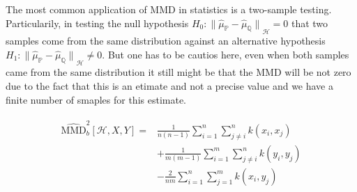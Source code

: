 The most common application of MMD in statistics is a two-sample testing. Particularily, in testing the null hypothesis $H_0:{\lVert \widehat{\mu}_{\mathds{P}} - \widehat{\mu}_{\mathds{Q}} \rVert }_{\mathscr{H}}=0$ that two samples come from the same distribution against an alternative hypothesis $H_1:{\lVert \widehat{\mu}_{\mathds{P}} - \widehat{\mu}_{\mathds{Q}} \rVert }_{\mathscr{H}}\neq0$. But one has to be cautios here, even when both samples came from the same distribution it still might be that the MMD will be not zero due to the fact that this is an etimate and not a precise value and we have a finite number of smaples for this estimate.

\begin{align}
    \begin{split}
        \widehat{\textrm{MMD}}_b^2 [\mathscr{H}, X, Y] = & \frac{1}{n(n-1)} \sum^n_{i=1}\sum^n_{j \neq i}k(x_i, x_j)\\
        & + \frac{1}{m(m-1)} \sum^m_{i=1}\sum^n_{j \neq i}k(y_i, y_j) \\
        & -\frac{2}{nm} \sum^n_{i=1}\sum^m_{j=1}k(x_i, y_j)
    \end{split}
\end{align}